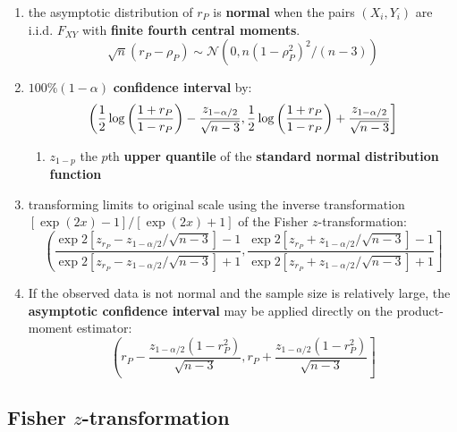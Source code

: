 \begin{enumerate}
    \item the asymptotic distribution of $r_P$ is \textbf{normal} when the pairs $(X_i, Y_i)$ are i.i.d. $F_{XY}$ with \textbf{finite fourth central moments}.
    \[
        \sqrt{n}(r_P - \rho _P ) 
        \sim 
        \mathcal{N} (0, n(1 - \rho ^2 _P )^2/(n - 3))
    \]
    
    \item $100\%(1 - \alpha)$ \textbf{confidence interval} by:
    \[\left(
        \dfrac{1}{2} \log\left(\dfrac{1+r_P}{1-r_P}\right) - \dfrac{z_{1-\alpha/2}}{\sqrt{n-3}},
        \dfrac{1}{2} \log\left(\dfrac{1+r_P}{1-r_P}\right) + \dfrac{z_{1-\alpha/2}}{\sqrt{n-3}}
    \right]\]
    
    \begin{enumerate}
        \item $z_{1-p}$ the $p$th \textbf{upper quantile} of the \textbf{standard normal distribution function}
    		
    \end{enumerate}
    
    \item transforming limits to original scale using the inverse transformation $[\exp{(2x)} - 1]/[\exp{(2x)} + 1]$ of the Fisher $z$-transformation:
    \[\left(
        \dfrac{
            \exp{2[z_{r_P} - z_{1-\alpha/2}/\sqrt{n - 3}]} - 1
        }{
            \exp{2[z_{r_P} - z_{1-\alpha/2}/\sqrt{n - 3}]} + 1
        },
        \dfrac{
            \exp{2[z_{r_P} + z_{1-\alpha/2}/\sqrt{n - 3}]} - 1
        }{
            \exp{2[z_{r_P} + z_{1-\alpha/2}/\sqrt{n - 3}]} + 1
        }
    \right]\]

    \item If the observed data is not normal and the sample size is relatively large, the \textbf{asymptotic confidence interval} may be applied directly on the product-moment estimator:
    \[\left(
        r_P - \dfrac{z_{1-\alpha/2}(1 - r ^2_P )}{\sqrt{n-3}},
        r_P + \dfrac{z_{1-\alpha/2}(1 - r ^2_P )}{\sqrt{n-3}}
    \right]\]


\end{enumerate}


\subsection{Fisher $z$-transformation \cite{ism-1}}\label{Fisher z-transformation}

